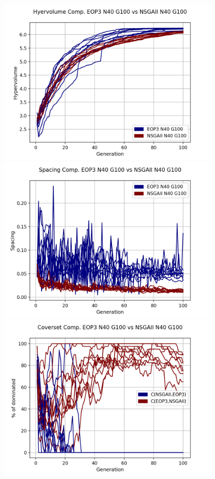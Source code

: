 \begin{figure}[H]
\centering
\includegraphics[scale=0.35]{../METRICS_PLOTS/Hypervol_COMP_EOP3N40G100_NSGAIIN40G100.png}
\includegraphics[scale=0.35]{../METRICS_PLOTS/Spacing_COMP_EOP3N40G100_NSGAIIN40G100.png}
\includegraphics[scale=0.35]{../METRICS_PLOTS/CoverSet_COMP_EOP3N40G100_NSGAIIN40G100.png}\\

\end{figure}
